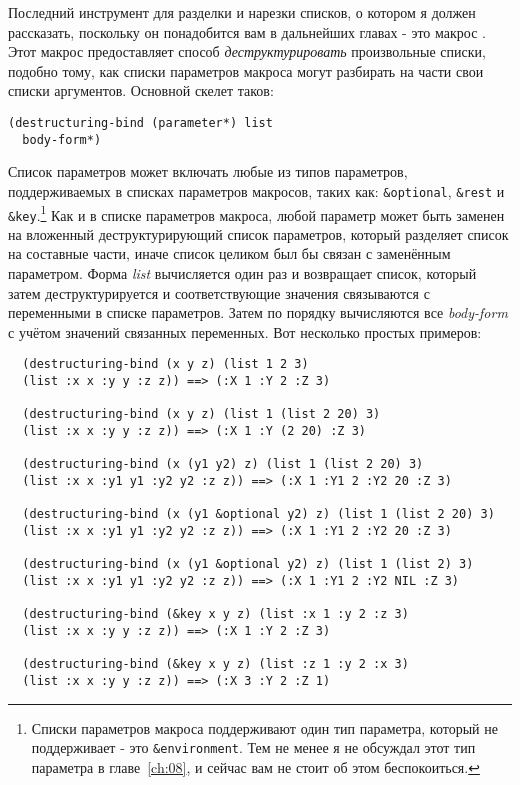 Последний инструмент для разделки и нарезки списков, о котором я должен рассказать,
поскольку он понадобится вам в дальнейших главах - это макрос
. Этот макрос предоставляет способ \textit{деструктурировать}
произвольные списки, подобно тому, как списки параметров макроса могут разбирать на части
свои списки аргументов. Основной скелет  таков:

\begin{lstlisting}
(destructuring-bind (parameter*) list
  body-form*)
\end{lstlisting}

Список параметров может включать любые из типов параметров, поддерживаемых в списках
параметров макросов, таких как: \lstinline!&optional!, \lstinline!&rest! и
\lstinline!&key!.\footnote{Списки параметров макроса поддерживают один тип параметра,
  который не поддерживает  - это \lstinline!&environment!. Тем не
  менее я не обсуждал этот тип параметра в главе~\ref{ch:08}, и сейчас вам не стоит об
  этом беспокоиться.} Как и в списке параметров макроса, любой параметр может быть заменен
на вложенный деструктурирующий список параметров, который разделяет список на составные
части, иначе список целиком был бы связан с заменённым параметром. Форма \textit{list}
вычисляется один раз и возвращает список, который затем деструктурируется и
соответствующие значения связываются с переменными в списке параметров. Затем по порядку
вычисляются все \textit{body-form} с учётом значений связанных переменных. Вот несколько
простых примеров:
  
\begin{verbatim}
  (destructuring-bind (x y z) (list 1 2 3)
  (list :x x :y y :z z)) ==> (:X 1 :Y 2 :Z 3)
  
  (destructuring-bind (x y z) (list 1 (list 2 20) 3)
  (list :x x :y y :z z)) ==> (:X 1 :Y (2 20) :Z 3)
  
  (destructuring-bind (x (y1 y2) z) (list 1 (list 2 20) 3)
  (list :x x :y1 y1 :y2 y2 :z z)) ==> (:X 1 :Y1 2 :Y2 20 :Z 3)
  
  (destructuring-bind (x (y1 &optional y2) z) (list 1 (list 2 20) 3)
  (list :x x :y1 y1 :y2 y2 :z z)) ==> (:X 1 :Y1 2 :Y2 20 :Z 3)
  
  (destructuring-bind (x (y1 &optional y2) z) (list 1 (list 2) 3)
  (list :x x :y1 y1 :y2 y2 :z z)) ==> (:X 1 :Y1 2 :Y2 NIL :Z 3)
  
  (destructuring-bind (&key x y z) (list :x 1 :y 2 :z 3)
  (list :x x :y y :z z)) ==> (:X 1 :Y 2 :Z 3)
  
  (destructuring-bind (&key x y z) (list :z 1 :y 2 :x 3)
  (list :x x :y y :z z)) ==> (:X 3 :Y 2 :Z 1)
\end{verbatim}

